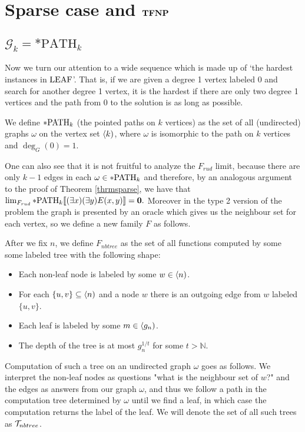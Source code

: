 \chapter{Sparse case and \texorpdfstring{$\textbf{TFNP}$}{TFNP}}\label{chapsparse}

\section{\texorpdfstring{$\mathcal{G}_k=*\text{PATH}_k$}{Gk=*PATHk}}

Now we turn our attention to a wide sequence which is made up of `the hardest instances in $\text{LEAF}$'. That is, if we are given a degree 1 vertex labeled $0$ and search for another degree 1 vertex, it is the hardest if there are only two degree 1 vertices and the path from $0$ to the solution is as long as possible.

\begin{defi}
We define $*\text{PATH}_k$ (the pointed paths on $k$ vertices) as the set of all (undirected) graphs $\omega$ on the vertex set $\langle k)$, where $\omega$ is isomorphic to the path on $k$ vertices and $\deg_G(0)=1$.
\end{defi}

One can also see that it is not fruitful to analyze the $F_{rud}$ limit, because there are only $k-1$ edges in each $\omega\in*\text{PATH}_k$ and therefore, by an analogous argument to the proof of Theorem \ref{thrmsparse}, we have that $\lim_{F_{rud}}*\text{PATH}_k[\![(\exists x)(\exists y)E(x,y)]\!]=\textbf{0}.$ Moreover in the type 2 version of the problem the graph is presented by an oracle which gives us the neighbour set for each vertex, so we define a new family $F$ as follows.

\begin{defi}
After we fix $n$, we define $F_{nbtree}$ as the set of all functions computed by some some labeled tree with the following shape:

\begin{itemize}
\item Each non-leaf node is labeled by some $w\in\langle n)$. 
\item For each $\{u,v\} \subseteq \langle n)$ and a node $w$ there is an outgoing edge from $w$ labeled $\{u,v\}$.
\item Each leaf is labeled by some $m\in \langle g_n)$.
\item The depth of the tree is at most $g_n^{1/t}$ for some $t>\mathbb{N}$.
\end{itemize}

Computation of such a tree on an undirected graph $\omega$ goes as follows. We interpret the non-leaf nodes as questions "what is the neighbour set of $w$?" and the edges as answers from our graph $\omega$, and thus we follow a path in the computation tree determined by $\omega$ until we find a leaf, in which case the computation returns the label of the leaf. We will denote the set of all such trees as $\mathcal{T}_{nbtree}$.
\end{defi}

